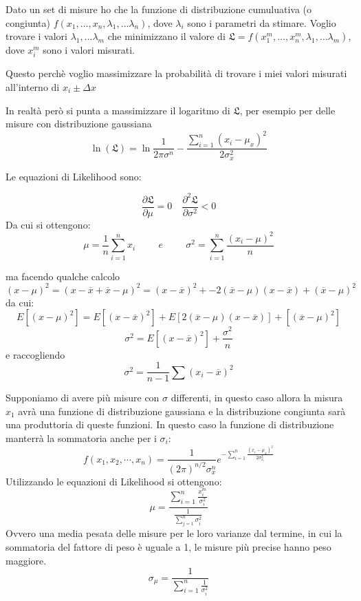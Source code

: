 \documentclass{article}
\theoremstyle{remark}
\begin{document}
Dato un set di misure ho che la funzione di distribuzione cumuluativa (o congiunta) 
$f(x_1, \dots, x_n, \lambda_1, \dots \lambda_n)$, dove $\lambda_i$ sono i parametri da stimare.
Voglio trovare i valori $\lambda_1,\dots \lambda_m$ che minimizzano il valore di $\mathfrak{L}=f(x_1^m, \dots, x_n^m, \lambda_1, \dots \lambda_m)$, dove $x_i^m$ sono i valori misurati.

Questo perchè voglio massimizzare la probabilità di trovare i miei valori misurati all'interno di $x_i \pm \Delta x$

In realtà però si punta a massimizzare il logaritmo di $\mathfrak{L}$, per esempio per delle misure con distribuzione gaussiana
\[
\ln(\mathfrak{L})= \ln\frac{1}{2\pi\sigma^n} - \frac{\sum_{i=1}^n (x_i - \mu_x)^2}{2\sigma_x^2}
\]

Le equazioni di Likelihood sono:

\[
\frac{\partial \mathfrak{L}}{\partial \mu}=0 \quad  \frac{\partial^2 \mathfrak{L}}{\partial \sigma^2}<0
\]
Da cui si ottengono: 
\[ \mu=\frac{1}{n} \sum_{i=1}^n x_i \hspace{1cm} e \hspace{1cm} \sigma^2=\sum_{i=1}^n \frac{(x_i-\mu)^2}{n} 
\]

ma facendo qualche calcolo
\[
(x-\mu)^2=(x-\overline{x}+\overline{x}-\mu)^2=(x-\overline{x})^2+-2(\overline{x}-\mu)(x-\overline{x})+(\overline{x}-\mu)^2
\]
da cui:
\[
E\left[(x-\mu)^2\right]=E\left[(x-\overline{x})^2\right]+E\left[2(\overline{x}-\mu)(x-\overline{x})\right]+\left[(\overline{x}-\mu)^2\right]
\]
\[\sigma^2=E\left[(x-\overline{x})^2\right]+\frac{\sigma^2}{n}                     
\]
e raccogliendo \[\sigma^2=\frac{1}{n-1}\sum {(x_i-\overline{x})^2}\]

Supponiamo di avere più misure con $\sigma$ differenti, in questo caso allora la misura $x_1$ avrà una funzione di distribuzione gaussiana e la distribuzione congiunta sarà una produttoria di queste funzioni.
In questo caso la funzione di distribuzione manterrà la sommatoria anche per i $\sigma_i$:
\begin{equation*}
    f(x_1, x_2, \cdots, x_n) = \frac{1}{(2\pi)^{n/2} \sigma_x^n} e^{-\sum_{i=1}^n \frac{(x_i - \mu_x)^2}{2\sigma_{x_{i}}^2}}
    \end{equation*}
Utilizzando le equazioni di Likelihood si ottengono:
\[
\mu=\frac{\sum_{i=1}^n \frac{x_i^m}{\sigma_i^2} }{\frac{1}{\sum_{j=1}^{n}\sigma_i^2}}
\]
Ovvero una media pesata delle misure per le loro varianze dal termine, in cui la sommatoria del fattore di peso è uguale a 1, le misure più precise hanno peso maggiore.
\[
\sigma_\mu=\frac{1}{\sum_{i=1}^{n}\frac{1}{\sigma_i^2}}
\]
\end{document}
